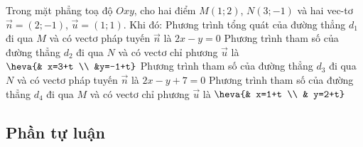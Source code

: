 \begin{ex}%
	Trong mặt phẳng toạ độ $Oxy$, cho hai điểm $M(1 ; 2)$, $N(3 ;-1)$ và hai vec-tơ $\overrightarrow{n}=(2 ;-1)$, $\overrightarrow{u}=(1 ; 1)$. Khi đó:
	\choiceTF
	{\True Phương trình tổng quát của đường thẳng $d_1$ đi qua $M$ và có vectơ pháp tuyến $\overrightarrow{n}$ là $2x-y=0$}
	{\True Phương trình tham số của đường thẳng $d_2$ đi qua $N$ và có vectơ chỉ phương $\overrightarrow{u}$ là $\heva{& x=3+t \\ &y=-1+t}$}
	{Phương trình tham số của đường thẳng $d_3$ đi qua $N$ và có vectơ pháp tuyến $\overrightarrow{n}$ là $2 x-y+7=0$}
	{\True Phương trình tham số của đường thẳng $d_4$ đi qua $M$ và có vectơ chỉ phương $\overrightarrow{u}$ là $\heva{& x=1+t  \\ & y=2+t}$} 
\end{ex}

\subsection{Phần tự luận}

\hienthiloigiaibt

